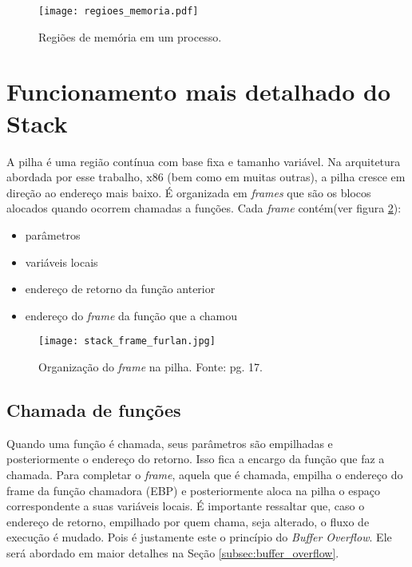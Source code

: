 	\begin{figure}
		\begin{center}
		\texttt{[image: regioes\_memoria.pdf]}
		\caption{Regiões de memória em um processo.}
		\label{fig:regioes_memoria}
		\end{center}
	\end{figure}

	\section{Funcionamento mais detalhado do Stack}
	A pilha é uma região contínua com base fixa e tamanho variável.
	Na arquitetura abordada por esse trabalho, x86 (bem como em muitas outras), a pilha cresce
	em direção ao endereço mais baixo. É organizada em \textsl{frames} que são os blocos
	alocados quando ocorrem chamadas a funções. Cada \textsl{frame} contém(ver figura \ref{fig:stack_frame}):
	\begin{itemize}
		\item parâmetros
		\item variáveis locais
		\item endereço de retorno da função anterior
		\item endereço do \textsl{frame} da função que a chamou
	\end{itemize}

	\begin{figure}
		\begin{center}
		\texttt{[image: stack\_frame\_furlan.jpg]}
		\caption{Organização do \textsl{frame} na pilha. Fonte: \cite{Furlan2005} pg. 17.}
		\label{fig:stack_frame}
		\end{center}
	\end{figure}

	\subsection{Chamada de funções}
	Quando uma função é chamada, seus parâmetros são empilhadas e posteriormente o endereço
	do retorno. Isso fica a encargo da função que faz a chamada.
	Para completar o \textsl{frame}, aquela que é chamada, empilha o endereço do frame da função chamadora
	(EBP) e posteriormente aloca na pilha o espaço correspondente a suas variáveis locais.
	É importante ressaltar que, caso o endereço de retorno, empilhado por quem chama, seja alterado,
	o fluxo de execução é mudado. Pois é justamente este o princípio do \textsl{Buffer Overflow}.
	Ele será abordado em maior detalhes na Seção \ref{subsec:buffer_overflow}.

